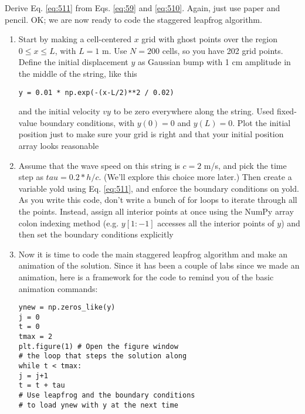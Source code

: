 \begin{problem}\label{P5.2} Derive Eq. \ref{eq:511} from Eqs. \ref{eq:59} and \ref{eq:510}. Again, just use paper and pencil.
OK; we are now ready to code the staggered leapfrog algorithm.\end{problem}
\begin{problem}\label{P5.3} 

\begin{enumerate}[label=(\alph*)]
\item Start by making a cell-centered $x$ grid with ghost points over the region
$0 \leq x \leq L$, with $L = 1$ m. Use $N = 200$ cells, so you have 202 grid
points. Define the initial displacement $y$ as Gaussian bump with 1 cm
amplitude in the middle of the string, like this
\begin{lstlisting}
y = 0.01 * np.exp(-(x-L/2)**2 / 0.02)
\end{lstlisting}
and the initial velocity $vy$ to be zero everywhere along the string. Used
fixed-value boundary conditions, with $y(0) = 0$ and $y(L) = 0$. Plot the
initial position just to make sure your grid is right and that your initial
position array looks reasonable
\item Assume that the wave speed on this string is $c = 2$ m/s, and pick
the time step as $tau = 0.2*h/c$. (We\rq ll explore this choice more
later.) Then create a variable yold using Eq. \ref{eq:511}, and enforce the boundary conditions on yold. As you write this code, don\rq t write a
bunch of for loops to iterate through all the points. Instead, assign all
interior points at once using the NumPy array colon indexing method
(e.g. $y[1:-1]$ accesses all the interior points of $y$) and then set the
boundary conditions explicitly
\item Now it is time to code the main staggered leapfrog algorithm and make
an animation of the solution. Since it has been a couple of labs since
we made an animation, here is a framework for the code to remind
you of the basic animation commands:
\begin{lstlisting}
ynew = np.zeros_like(y)
j = 0
t = 0
tmax = 2
plt.figure(1) # Open the figure window
# the loop that steps the solution along
while t < tmax:
j = j+1
t = t + tau
# Use leapfrog and the boundary conditions
# to load ynew with y at the next time

\end{lstlisting}
\end{enumerate}
\end{problem}
